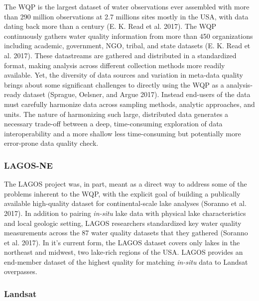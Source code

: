 \documentclass[]{article}
\begin{document}
The WQP is the largest dataset of water observations ever assembled with
more than 290 million observations at 2.7 millions sites mostly in the
USA, with data dating back more than a century (E. K. Read et al. 2017).
The WQP continuously gathers water quality information from more than
450 organizations including academic, government, NGO, tribal, and state
datasets (E. K. Read et al. 2017). These datastreams are gathered and
distributed in a standardized format, making analysis across different
collection methods more readily available. Yet, the diversity of data
sources and variation in meta-data quality brings about some significant
challenges to directly using the WQP as a analysis-ready dataset
(Sprague, Oelsner, and Argue 2017). Instead end-users of the data must
carefully harmonize data across sampling methods, analytic approaches,
and units. The nature of harmonizing such large, distributed data
generates a necessary trade-off between a deep, time-consuming
exploration of data interoperability and a more shallow less
time-consuming but potentially more error-prone data quality check.

\subsubsection{LAGOS-NE}\label{lagos-ne}

The LAGOS project was, in part, meant as a direct way to address some of
the problems inherent to the WQP, with the explicit goal of building a
publically available high-quality dataset for continental-scale lake
analyses (Soranno et al. 2017). In addition to pairing \emph{in-situ}
lake data with physical lake characteristics and local geologic setting,
LAGOS researchers standardized key water quality measurements across the
87 water quality datasets that they gathered (Soranno et al. 2017). In
it's current form, the LAGOS dataset covers only lakes in the northeast
and midwest, two lake-rich regions of the USA. LAGOS provides an
end-member dataset of the highest quality for matching \emph{in-situ}
data to Landsat overpasses.

\subsubsection{Landsat}\label{landsat}
\end{document}
